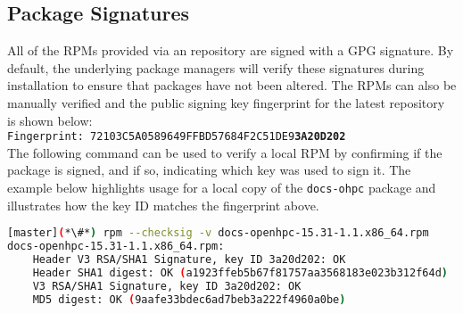 \clearpage
\subsection{Package Signatures}

All of the RPMs provided via an \OHPC{} repository are signed with a GPG
signature. By default, the underlying package managers will verify these signatures during
installation to ensure that packages have not been altered. The RPMs can also
be manually verified and the public signing key fingerprint for the latest
repository is shown below: \\

\texttt{Fingerprint: 72103C5A0589649FFBD57684F2C51DE9{\bf3A20D202}} \\

\noindent The following command can be used to verify a local RPM by confirming if the package
is signed, and if so, indicating which key was used to sign it.  The example
below highlights usage for a local copy of the \texttt{docs-ohpc} package and
illustrates how the key ID matches the fingerprint above.

\begin{lstlisting}[language=bash,keywords={}]
[master](*\#*) rpm --checksig -v docs-openhpc-15.31-1.1.x86_64.rpm
docs-openhpc-15.31-1.1.x86_64.rpm:
    Header V3 RSA/SHA1 Signature, key ID 3a20d202: OK
    Header SHA1 digest: OK (a1923ffeb5b67f81757aa3568183e023b312f64d)
    V3 RSA/SHA1 Signature, key ID 3a20d202: OK
    MD5 digest: OK (9aafe33bdec6ad7beb3a222f4960a0be)
\end{lstlisting}



